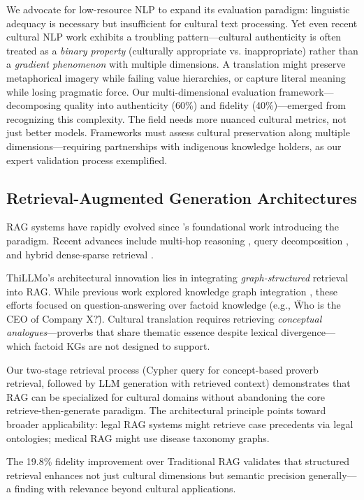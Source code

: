 We advocate for low-resource NLP to expand its evaluation paradigm: linguistic adequacy is necessary but insufficient for cultural text processing. Yet even recent cultural NLP work exhibits a troubling pattern—cultural authenticity is often treated as a \emph{binary property} (culturally appropriate vs. inappropriate) rather than a \emph{gradient phenomenon} with multiple dimensions. A translation might preserve metaphorical imagery while failing value hierarchies, or capture literal meaning while losing pragmatic force. Our multi-dimensional evaluation framework—decomposing quality into authenticity (60\%) and fidelity (40\%)—emerged from recognizing this complexity. The field needs more nuanced cultural metrics, not just better models. Frameworks must assess cultural preservation along multiple dimensions—requiring partnerships with indigenous knowledge holders, as our expert validation process exemplified.

\subsection{Retrieval-Augmented Generation Architectures}
\label{subsec:rag_architectures}

RAG systems have rapidly evolved since \citet{lewis2020retrieval}'s foundational work introducing the paradigm. Recent advances include multi-hop reasoning \citep{khattab2021baleen}, query decomposition \citep{press2022measuring}, and hybrid dense-sparse retrieval \citep{luo2023hybrid}.

ThiLLMo's architectural innovation lies in integrating \emph{graph-structured} retrieval into RAG. While previous work explored knowledge graph integration \citep{sun2020knowledge, yasunaga2021qagnn}, these efforts focused on question-answering over factoid knowledge (e.g., \"Who is the CEO of Company X?\"). Cultural translation requires retrieving \emph{conceptual analogues}—proverbs that share thematic essence despite lexical divergence—which factoid KGs are not designed to support.

Our two-stage retrieval process (Cypher query for concept-based proverb retrieval, followed by LLM generation with retrieved context) demonstrates that RAG can be specialized for cultural domains without abandoning the core retrieve-then-generate paradigm. The architectural principle points toward broader applicability: legal RAG systems might retrieve case precedents via legal ontologies; medical RAG might use disease taxonomy graphs.

The 19.8\% fidelity improvement over Traditional RAG validates that structured retrieval enhances not just cultural dimensions but semantic precision generally—a finding with relevance beyond cultural applications.

